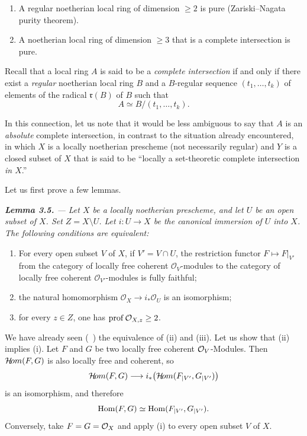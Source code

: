 \begin{enumerate}
  \renewcommand{\labelenumi}{(\roman{enumi})}
  \item A regular noetherian local ring of dimension $\geq 2$ is pure
  (Zariski--Nagata purity theorem).
  \item A noetherian local ring of dimension $\geq 3$ that is a complete
  intersection is pure.
\end{enumerate}

\medskip
\noindent Recall that a local ring $A$ is said to be a \emph{complete
intersection} if and only if there exist a \emph{regular} noetherian local
ring $B$ and a $B$-regular sequence $(t_1,\ldots,t_k)$ of elements of the
radical $\mathfrak r(B)$ of $B$ such that
\[
  A \simeq B/(t_1,\ldots,t_k).
\]

\medskip
\noindent In this connection, let us note that it would be less ambiguous to
say that $A$ is an \emph{absolute} complete intersection, in contrast to the
situation already encountered, in which $X$ is a locally noetherian prescheme
(not necessarily regular) and $Y$ is a closed subset of $X$ that is said to
be ``locally a set-theoretic complete intersection \emph{in $X$}.''

\medskip
\noindent Let us first prove a few lemmas.

\medskip
{\itshape
{}\noindent\textbf{Lemma 3.5.} --- Let $X$ be a locally noetherian prescheme,
and let $U$ be an open subset of $X$. Set $Z=X\setminus U$. Let
$i\colon U\to X$ be the canonical immersion of $U$ into $X$. The following
conditions are equivalent:
\begin{enumerate}[label=\textup{(\roman*)},leftmargin=2.2em,itemsep=0.45em,topsep=0.45em]
\item For every open subset $V$ of $X$, if $V'=V\cap U$, the restriction
functor $F\longmapsto F|_{V'}$ from the category of locally free coherent
$\mathcal O_V$-modules to the category of locally free coherent
$\mathcal O_{V'}$-modules is fully faithful;
\item the natural homomorphism $\mathcal O_X\to i_*\mathcal O_U$ is an
isomorphism;
\item for every $z\in Z$, one has $\prof\mathcal O_{X,z}\geq 2$.
\end{enumerate}
}

We have already seen (~) the equivalence of (ii)
and (iii). Let us show that (ii) implies (i). Let $F$ and $G$ be two
locally free coherent $\Oo_V$-Modules. Then $\SheafHom(F,G)$ is also
locally free and coherent, so
$$
\SheafHom(F,G)\longrightarrow
i_\ast\bigl(\SheafHom(\sisi{F|{|V'}}{F_{|V'}},
\sisi{G|{|V'}}{G_{|V'}})\bigr)
$$
is an isomorphism, and therefore
$$
\Hom(F,G)\simeq
\Hom(\sisi{F|{|V'}}{F_{|V'}},\sisi{G|{|V'}}{G_{|V'}}).
$$
Conversely, take $F=G=\OX$ and apply (i) to every open subset $V$ of
$X$.

